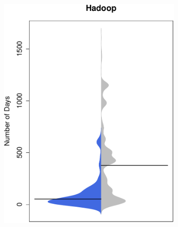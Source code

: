 \begin{figure}[t]
\begin{subfigure}[b]{0.20\textwidth}
	 	\includegraphics[width=\textwidth]{figures/test/hadoop_update.pdf}
	 	\label{fig:removal_comparison_tomcat} 
	 \end{subfigure}
	 
	 
	 

\end{figure}
